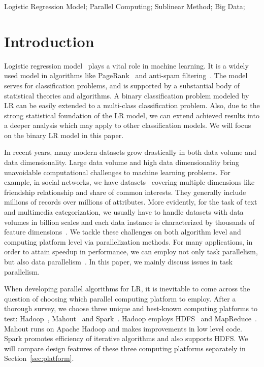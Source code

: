 \documentclass[10pt, conference, compsocconf]{IEEEtran}
\begin{document}
\begin{IEEEkeywords}
Logistic Regression Model; Parallel Computing; Sublinear Method; Big Data;
\end{IEEEkeywords}

\section{Introduction} \label{sec:int}
Logistic regression model~\cite{HastieBook:SL} plays a vital role in machine learning.
It is a widely used model in algorithms like PageRank~\cite{page1999pagerank} and anti-spam filtering~\cite{androutsopoulos2000evaluation}.
The model serves for classification problems, and is supported by a substantial body of statistical theories and algorithms.
A binary classification problem modeled by LR can be easily extended to a multi-class classification problem.
Also, due to the strong statistical foundation of the LR model, we can extend achieved results into a deeper analysis which may apply to other classification models. We will focus on the binary LR model in this paper.

In recent years, many modern datasets grow drastically in both data volume and data dimensionality.
Large data volume and high data dimensionality bring unavoidable computational challenges to machine learning problems.
For example, in social networks, we have datasets~\cite{lewis2008tastes} covering multiple dimensions like friendship relationship and share of common interests. They generally include millions of records over millions of attributes. More evidently, for the task of text and multimedia categorization, we usually have to handle datasets with data volumes in billion scales and each data instance is characterized by thousands of feature dimensions~\cite{chang2011foundations}.
We tackle these challenges on both algorithm level and computing platform level via parallelization methods.
For many applications, in order to attain speedup in performance, we can employ not only task parallelism, but also data parallelism~\cite{subhlok1993exploiting}.
In this paper, we mainly discuss issues in task parallelism.

When developing parallel algorithms for LR, it is inevitable to come across the question of choosing which parallel computing platform to employ.
After a thorough survey, we choose three unique and best-known computing platforms to test: Hadoop~\cite{white2012hadoop}, Mahout~\cite{mahoutscalable} and Spark~\cite{zaharia2010spark}.
Hadoop employs HDFS~\cite{borthakur2008hdfs} and MapReduce~\cite{dean2008mapreduce}.
Mahout runs on Apache Hadoop and makes improvements in low level code.
Spark promotes efficiency of iterative algorithms and also supports HDFS.
We will compare design features of these three computing platforms separately in Section~\ref{sec:platform}.
\end{document}
